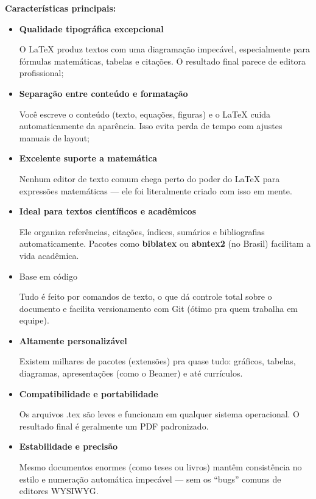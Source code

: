 \documentclass[12pt,a4paper]{article}
\begin{document}
	
	\textbf{Características principais:}
	\begin{itemize}
		\item \textbf{Qualidade tipográfica excepcional}
		
		O LaTeX produz textos com uma diagramação impecável, especialmente para fórmulas matemáticas, tabelas e citações. O resultado final parece de editora profissional;
		
		\item \textbf{Separação entre conteúdo e formatação}
		
		Você escreve o conteúdo (texto, equações, figuras) e o LaTeX cuida automaticamente da aparência. Isso evita perda de tempo com ajustes manuais de layout;
		
		\item \textbf{Excelente suporte a matemática}
		
		Nenhum editor de texto comum chega perto do poder do LaTeX para expressões matemáticas — ele foi literalmente criado com isso em mente.
		
		\item \textbf{Ideal para textos científicos e acadêmicos}
		
		Ele organiza referências, citações, índices, sumários e bibliografias automaticamente.
		Pacotes como \textbf{biblatex} ou \textbf{abntex2} (no Brasil) facilitam a vida acadêmica.
		
		\item Base em código
		
		Tudo é feito por comandos de texto, o que dá controle total sobre o documento e facilita versionamento com Git (ótimo pra quem trabalha em equipe).
		
		\item \textbf{Altamente personalizável}
		
		Existem milhares de pacotes (extensões) pra quase tudo: gráficos, tabelas, diagramas, apresentações (como o Beamer) e até currículos.
		
		\item \textbf{Compatibilidade e portabilidade}
		
		Os arquivos .tex são leves e funcionam em qualquer sistema operacional. O resultado final é geralmente um PDF padronizado.
		
		\item \textbf{Estabilidade e precisão}
		
		Mesmo documentos enormes (como teses ou livros) mantêm consistência no estilo e numeração automática impecável — sem os “bugs” comuns de editores WYSIWYG.
	
	\end{itemize}
	
\end{document}
